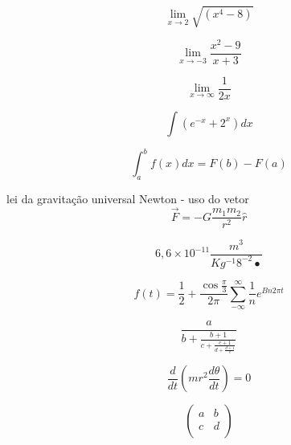 \documentclass[12pt, a4paper, oneside]{article}
\begin{document}
\begin{equation}
\lim_{x\rightarrow 2} \sqrt{(x^{4}-8)}
\end{equation}
 
 \begin{equation}
 \lim_{x\rightarrow -3} \frac{x^{2}-9}{x+3}
 \end{equation}
 
 \begin{equation}
 \lim_{x\rightarrow\infty} \frac{1}{2x}
 \end{equation}

\begin{equation}
\int(e^{-x} + 2^{x})dx
\end{equation}

\begin{equation}
\int^{b}_{a} f(x)dx = F(b)- F (a)
\end{equation}

 lei da gravitação universal Newton - uso do vetor
\begin{equation}
\vec{F} = -G\frac{m_1m_2}{r^2}\hat{r}
\end{equation}

\begin{equation}
6,6 \times 10^{-11} \frac{m^{3}}{Kg^{-1} 8^{-2}•}
\end{equation}

\begin{equation}
f(t)= \frac{1}{2} + \frac{\cos\frac{\pi}{3}}{2\pi}\sum_{-\infty} ^{\infty} \frac{1}{n} e^{Bn2\pi t}
\end{equation}
\vspace{1,0cm}

\begin{equation}
\frac{a}{b+\frac{b+1}{c+\frac{c+1}{d+\frac{d+1}{e}}}}
\end{equation}


\vspace{1,0cm}

\begin{equation}
\frac{d}{dt}\left( mr^{2} \frac{d\theta}{dt}\right) = 0
\end{equation}
\vspace{1,0cm}

\begin{equation}
\left(
\begin{array}{lr}
 a & b \\
 c & d \\
 
\end{array}
\right) 
\end{equation}
\end{document}
